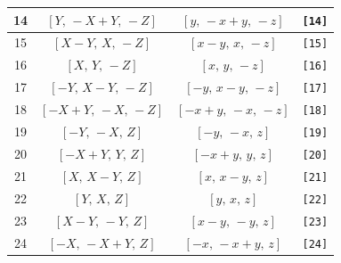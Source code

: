 \documentclass[fleqn,8pt]{jsarticle}
\begin{document}
\begin{longtable}{cccc}
14 & $\left[ Y,\, - X + Y,\, - Z \right]$ & $\left[ y,\, - x + y,\, - z \right]$ & {\tt [14]} \\ \hline
15 & $\left[ X - Y,\, X,\, - Z \right]$ & $\left[ x - y,\, x,\, - z \right]$ & {\tt [15]} \\ \hline
16 & $\left[ X,\, Y,\, - Z \right]$ & $\left[ x,\, y,\, - z \right]$ & {\tt [16]} \\ \hline
17 & $\left[ - Y,\, X - Y,\, - Z \right]$ & $\left[ - y,\, x - y,\, - z \right]$ & {\tt [17]} \\ \hline
18 & $\left[ - X + Y,\, - X,\, - Z \right]$ & $\left[ - x + y,\, - x,\, - z \right]$ & {\tt [18]} \\ \hline
19 & $\left[ - Y,\, - X,\, Z \right]$ & $\left[ - y,\, - x,\, z \right]$ & {\tt [19]} \\ \hline
20 & $\left[ - X + Y,\, Y,\, Z \right]$ & $\left[ - x + y,\, y,\, z \right]$ & {\tt [20]} \\ \hline
21 & $\left[ X,\, X - Y,\, Z \right]$ & $\left[ x,\, x - y,\, z \right]$ & {\tt [21]} \\ \hline
22 & $\left[ Y,\, X,\, Z \right]$ & $\left[ y,\, x,\, z \right]$ & {\tt [22]} \\ \hline
23 & $\left[ X - Y,\, - Y,\, Z \right]$ & $\left[ x - y,\, - y,\, z \right]$ & {\tt [23]} \\ \hline
24 & $\left[ - X,\, - X + Y,\, Z \right]$ & $\left[ - x,\, - x + y,\, z \right]$ & {\tt [24]} \\
\end{longtable}
\end{document}
